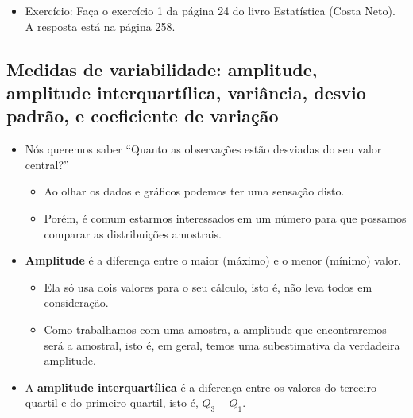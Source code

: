\documentclass[]{article}
\providecommand{\tightlist}{%
  \setlength{\itemsep}{0pt}\setlength{\parskip}{0pt}}
\begin{document}
\begin{itemize}
\tightlist
\item
  Exercício: Faça o exercício 1 da página 24 do livro Estatística (Costa
  Neto). A resposta está na página 258.
\end{itemize}

\subsection{Medidas de variabilidade: amplitude, amplitude
interquartílica, variância, desvio padrão, e coeficiente de
variação}\label{medidas-de-variabilidade-amplitude-amplitude-interquartilica-variancia-desvio-padrao-e-coeficiente-de-variacao}

\begin{itemize}
\tightlist
\item
  Nós queremos saber ``Quanto as observações estão desviadas do seu
  valor central?''

  \begin{itemize}
  \tightlist
  \item
    Ao olhar os dados e gráficos podemos ter uma sensação disto.
  \item
    Porém, é comum estarmos interessados em um número para que possamos
    comparar as distribuições amostrais.
  \end{itemize}
\item
  \textbf{Amplitude} é a diferença entre o maior (máximo) e o menor
  (mínimo) valor.

  \begin{itemize}
  \tightlist
  \item
    Ela só usa dois valores para o seu cálculo, isto é, não leva todos
    em consideração.
  \item
    Como trabalhamos com uma amostra, a amplitude que encontraremos será
    a amostral, isto é, em geral, temos uma subestimativa da verdadeira
    amplitude.
  \end{itemize}
\item
  A \textbf{amplitude interquartílica} é a diferença entre os valores do
  terceiro quartil e do primeiro quartil, isto é, \(Q_{3} - Q_{1}\).


\end{itemize}
\end{document}
